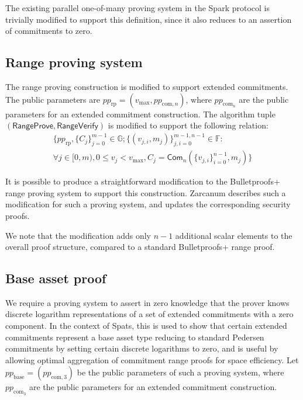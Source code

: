 \documentclass{article}
\newcommand{\G}{\mathbb{G}}
\newcommand{\F}{\mathbb{F}}
\newcommand{\func}[1]{\mathsf{#1}}
\newcommand{\com}{\func{Com}}
\begin{document}
The existing parallel one-of-many proving system in the Spark protocol is trivially modified to support this definition, since it also reduces to an assertion of commitments to zero.


\subsection{Range proving system}

The range proving construction is modified to support extended commitments.
The public parameters are $pp_{\text{rp}} = (v_{\text{max}}, pp_{\text{com},n})$, where $pp_{\text{com}_n}$ are the public parameters for an extended commitment construction.
The algorithm tuple $(\func{RangeProve}, \func{RangeVerify})$ is modified to support the following relation:
\begin{multline*}
\{ pp_{\text{rp}}, \{C_j\}_{j=0}^{m-1} \in \G ; \{(v_{j,i}, m_j)\}_{j,i=0}^{m-1,n-1} \in \F : \\
\forall j \in [0,m), 0 \leq v_j < v_{\text{max}}, C_j = \com_n(\{v_{j,i}\}_{i=0}^{n-1}, m_j) \}
\end{multline*}

It is possible to produce a straightforward modification to the Bulletproofs+ range proving system to support this construction.
Zarcanum \cite{zarcanum} describes such a modification for such a proving system, and updates the corresponding security proofs.

We note that the modification adds only $n-1$ additional scalar elements to the overall proof structure, compared to a standard Bulletproofs+ range proof.


\subsection{Base asset proof}

We require a proving system to assert in zero knowledge that the prover knows discrete logarithm representations of a set of extended commitments with a zero component.
In the context of Spats, this is used to show that certain extended commitments represent a base asset type reducing to standard Pedersen commitments by setting certain discrete logarithms to zero, and is useful by allowing optimal aggregation of commitment range proofs for space efficiency.
Let $pp_{\text{base}} = (pp_{\text{com},3})$ be the public parameters of such a proving system, where $pp_{\text{com}_3}$ are the public parameters for an extended commitment construction.
\end{document}
